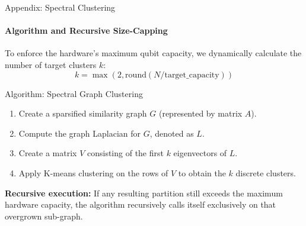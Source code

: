 \documentclass[10pt, aspectratio=169]{beamer}
\begin{document}
\begin{frame}{Appendix: Spectral Clustering}
\framesubtitle{Algorithm and Recursive Size-Capping}
    
    To enforce the hardware's maximum qubit capacity, we dynamically calculate the number of target clusters $k$:
    $$ k = \max(2, \text{round}(N / \text{target\_capacity})) $$
    
    \vspace{0.2cm}
    \begin{block}{Algorithm: Spectral Graph Clustering}
        \begin{enumerate}
            \item Create a sparsified similarity graph $G$ (represented by matrix $A$).
            \item Compute the graph Laplacian for $G$, denoted as $L$.
            \item Create a matrix $V$ consisting of the first $k$ eigenvectors of $L$.
            \item Apply K-means clustering on the rows of $V$ to obtain the $k$ discrete clusters.
        \end{enumerate}
    \end{block}
    
    \vspace{0.2cm}
    \textbf{Recursive execution:} If any resulting partition still exceeds the maximum hardware capacity, the algorithm recursively calls itself exclusively on that overgrown sub-graph.
\end{frame}
\end{document}
